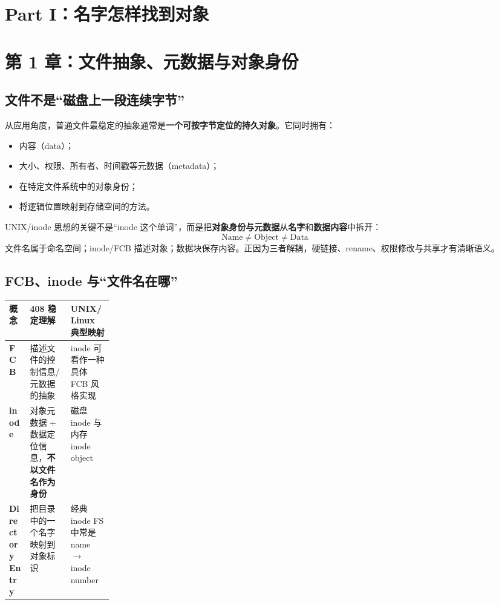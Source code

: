 \documentclass[11pt,a4paper]{ctexart}
\newcommand{\kw}[1]{\textbf{#1}}
\begin{document}
\section{Part I：名字怎样找到对象}

\section{第 1 章：文件抽象、元数据与对象身份}

\subsection{文件不是“磁盘上一段连续字节”}
从应用角度，普通文件最稳定的抽象通常是\kw{一个可按字节定位的持久对象}。它同时拥有：
\begin{itemize}
  \item 内容（data）；
  \item 大小、权限、所有者、时间戳等元数据（metadata）；
  \item 在特定文件系统中的对象身份；
  \item 将逻辑位置映射到存储空间的方法。
\end{itemize}

\begin{corebox}[元数据与数据分离]
UNIX/inode 思想的关键不是“inode 这个单词”，而是把\kw{对象身份与元数据}从\kw{名字}和\kw{数据内容}中拆开：
\[
\boxed{\text{Name}\neq\text{Object}\neq\text{Data}}
\]
文件名属于命名空间；inode/FCB 描述对象；数据块保存内容。正因为三者解耦，硬链接、rename、权限修改与共享才有清晰语义。
\end{corebox}

\subsection{FCB、inode 与“文件名在哪”}
\begin{center}
\small
\renewcommand{\arraystretch}{1.25}
\begin{tabularx}{\linewidth}{>{\bfseries}p{0.20\linewidth} X X}
\toprule
概念 & 408 稳定理解 & UNIX/Linux 典型映射 \\
\midrule
FCB & 描述文件的控制信息/元数据的抽象 & inode 可看作一种具体 FCB 风格实现 \\
inode & 对象元数据 + 数据定位信息，\kw{不以文件名作为身份} & 磁盘 inode 与内存 inode object \\
Directory Entry & 把目录中的一个名字映射到对象标识 & 经典 inode FS 中常是 name $\to$ inode number \\
\bottomrule
\end{tabularx}
\end{center}
\end{document}
